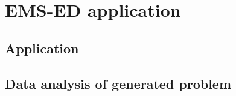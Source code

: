 \section{EMS-ED application}

\subsection{Application}

\subsection{Data analysis of generated problem}